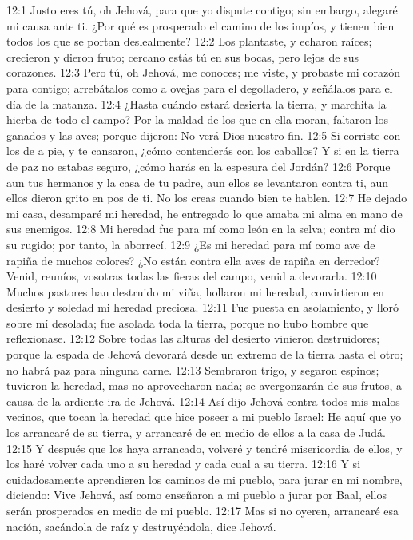 12:1 Justo eres tú, oh Jehová, para que yo dispute contigo; sin embargo, alegaré mi causa ante ti. ¿Por qué es prosperado el camino de los impíos, y tienen bien todos los que se portan deslealmente? 
12:2 Los plantaste, y echaron raíces; crecieron y dieron fruto; cercano estás tú en sus bocas, pero lejos de sus corazones. 
12:3 Pero tú, oh Jehová, me conoces; me viste, y probaste mi corazón para contigo; arrebátalos como a ovejas para el degolladero, y señálalos para el día de la matanza. 
12:4 ¿Hasta cuándo estará desierta la tierra, y marchita la hierba de todo el campo? Por la maldad de los que en ella moran, faltaron los ganados y las aves; porque dijeron: No verá Dios nuestro fin. 
12:5 Si corriste con los de a pie, y te cansaron, ¿cómo contenderás con los caballos? Y si en la tierra de paz no estabas seguro, ¿cómo harás en la espesura del Jordán? 
12:6 Porque aun tus hermanos y la casa de tu padre, aun ellos se levantaron contra ti, aun ellos dieron grito en pos de ti. No los creas cuando bien te hablen. 
12:7 He dejado mi casa, desamparé mi heredad, he entregado lo que amaba mi alma en mano de sus enemigos. 
12:8 Mi heredad fue para mí como león en la selva; contra mí dio su rugido; por tanto, la aborrecí. 
12:9 ¿Es mi heredad para mí como ave de rapiña de muchos colores? ¿No están contra ella aves de rapiña en derredor? Venid, reuníos, vosotras todas las fieras del campo, venid a devorarla. 
12:10 Muchos pastores han destruido mi viña, hollaron mi heredad, convirtieron en desierto y soledad mi heredad preciosa. 
12:11 Fue puesta en asolamiento, y lloró sobre mí desolada; fue asolada toda la tierra, porque no hubo hombre que reflexionase. 
12:12 Sobre todas las alturas del desierto vinieron destruidores; porque la espada de Jehová devorará desde un extremo de la tierra hasta el otro; no habrá paz para ninguna carne. 
12:13 Sembraron trigo, y segaron espinos; tuvieron la heredad, mas no aprovecharon nada; se avergonzarán de sus frutos, a causa de la ardiente ira de Jehová. 
12:14 Así dijo Jehová contra todos mis malos vecinos, que tocan la heredad que hice poseer a mi pueblo Israel: He aquí que yo los arrancaré de su tierra, y arrancaré de en medio de ellos a la casa de Judá. 
12:15 Y después que los haya arrancado, volveré y tendré misericordia de ellos, y los haré volver cada uno a su heredad y cada cual a su tierra. 
12:16 Y si cuidadosamente aprendieren los caminos de mi pueblo, para jurar en mi nombre, diciendo: Vive Jehová, así como enseñaron a mi pueblo a jurar por Baal, ellos serán prosperados en medio de mi pueblo. 
12:17 Mas si no oyeren, arrancaré esa nación, sacándola de raíz y destruyéndola, dice Jehová. 
